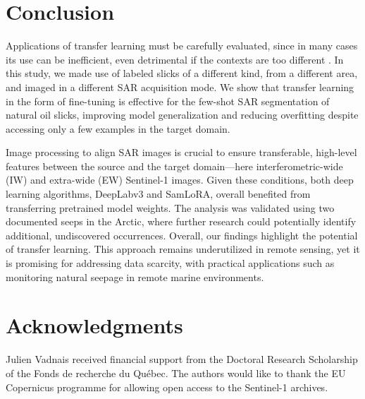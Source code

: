 \documentclass[journal]{IEEEtran}
\begin{document}
\section{Conclusion}
Applications of transfer learning must be carefully evaluated, since in many cases its use can be inefficient, even detrimental if the contexts are too different \cite{mensinkFactorsInfluenceTransfer2022}.
In this study, we made use of labeled slicks of a different kind, from a different area, and imaged in a different SAR acquisition mode. 
We show that transfer learning in the form of fine-tuning is effective for the few-shot SAR segmentation of natural oil slicks, improving model generalization and reducing overfitting 
despite accessing only a few examples in the target domain.

Image processing to align SAR images is crucial to ensure transferable, high-level features between the source and the target domain—here interferometric-wide (IW) and extra-wide (EW) Sentinel-1 images.
Given these conditions, both deep learning algorithms, DeepLabv3 and SamLoRA, overall benefited from transferring pretrained model weights.
The analysis was validated using two documented seeps in the Arctic, where further research could potentially identify additional, undiscovered occurrences. 
Overall, our findings highlight the potential of transfer learning. This approach remains underutilized in remote sensing, yet it is promising for addressing data scarcity, 
with practical applications such as monitoring natural seepage in remote marine environments. 

\section*{Acknowledgments}
Julien Vadnais received financial support from the Doctoral Research Scholarship of the Fonds de recherche du Québec. 
The authors would like to thank the EU Copernicus programme for allowing open access to the Sentinel-1 archives.



\end{document}
